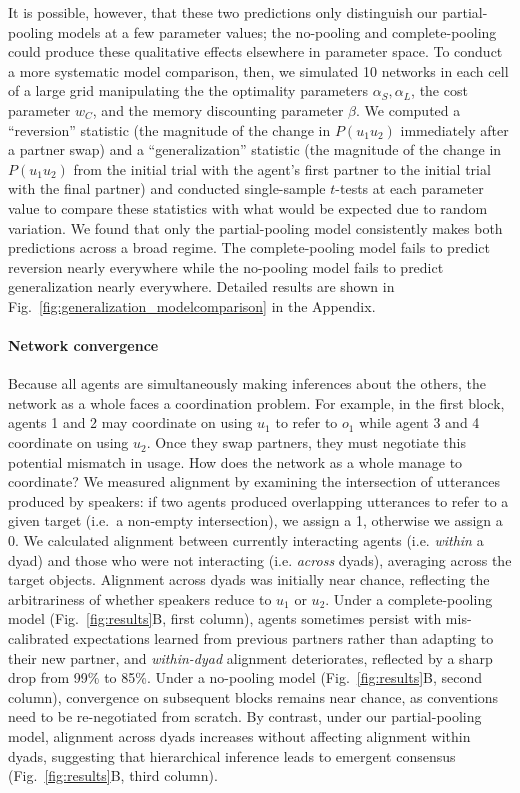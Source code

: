 It is possible, however, that these two predictions only distinguish our partial-pooling models at a few parameter values; the no-pooling and complete-pooling could produce these qualitative effects elsewhere in parameter space.
To conduct a more systematic model comparison, then, we simulated 10 networks in each cell of a large grid manipulating the the optimality parameters $\alpha_S,\alpha_L$, the cost parameter $w_C$, and the memory discounting parameter $\beta$. 
We computed a ``reversion'' statistic (the magnitude of the change in $P(u_1u_2)$ immediately after a partner swap) and a ``generalization'' statistic (the magnitude of the change in $P(u_1u_2)$ from the initial trial with the agent's first partner to the initial trial with the final partner) and conducted single-sample $t$-tests at each parameter value to compare these statistics with what would be expected due to random variation.
We found that only the partial-pooling model consistently makes both predictions across a broad regime. 
The complete-pooling model fails to predict reversion nearly everywhere while the no-pooling model fails to predict generalization nearly everywhere.
Detailed results are shown in Fig.~\ref{fig:generalization_modelcomparison} in the Appendix.

\paragraph{Network convergence}

Because all agents are simultaneously making inferences about the others, the network as a whole faces a coordination problem.
For example, in the first block, agents 1 and 2 may coordinate on using $u_1$ to refer to $o_1$ while agent 3 and 4 coordinate on using $u_2$. 
Once they swap partners, they must negotiate this potential mismatch in usage. 
How does the network as a whole manage to coordinate?
We measured alignment by examining the intersection of utterances produced by speakers: if two agents produced overlapping utterances to refer to a given target (i.e.~a non-empty intersection), we assign a 1, otherwise we assign a 0.
We calculated alignment between currently interacting agents (i.e. \emph{within} a dyad) and those who were not interacting (i.e. \emph{across} dyads), averaging across the target objects.
Alignment across dyads was initially near chance, reflecting the arbitrariness of whether speakers reduce to $u_1$ or $u_2$. 
Under a complete-pooling model (Fig.~\ref{fig:results}B, first column), agents sometimes persist with mis-calibrated expectations learned from previous partners rather than adapting to their new partner, and \emph{within-dyad} alignment deteriorates, reflected by a sharp drop from 99\% to 85\%.
Under a no-pooling model (Fig.~\ref{fig:results}B, second column), convergence on subsequent blocks remains near chance, as conventions need to be re-negotiated from scratch.
By contrast, under our partial-pooling model, alignment across dyads increases without affecting alignment within dyads, suggesting that hierarchical inference leads to emergent consensus (Fig.~\ref{fig:results}B, third column).

